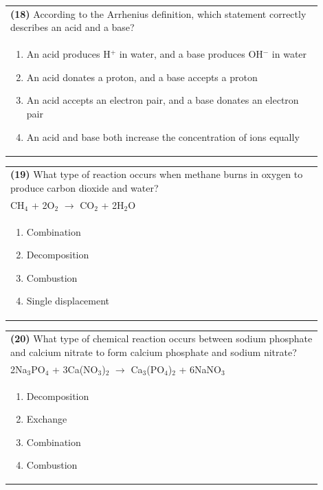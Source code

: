 \documentclass{article}
\begin{document}
\noindent\begin{tabular}{|p{0.9\linewidth}|}
\hline
\textbf{(18)} According to the Arrhenius definition, which statement correctly describes an acid and a base?\\[0.2cm]
\begin{minipage}[t]{0.85\linewidth}
\begin{enumerate}[label=\alph*.]
\item An acid produces H$^+$ in water, and a base produces OH$^-$ in water
\item An acid donates a proton, and a base accepts a proton
\item An acid accepts an electron pair, and a base donates an electron pair
\item An acid and base both increase the concentration of ions equally
\end{enumerate}
\end{minipage}\\[0.2cm]
\hline
\end{tabular}


\noindent\begin{tabular}{|p{0.9\linewidth}|}
\hline
\textbf{(19)} What type of reaction occurs when methane burns in oxygen to produce carbon dioxide and water?\\[0.2cm]
CH$_4$ + 2O$_2$ $\rightarrow$ CO$_2$ + 2H$_2$O\\[0.2cm]
\begin{minipage}[t]{0.85\linewidth}
\begin{enumerate}[label=\alph*.]
\item Combination
\item Decomposition
\item Combustion
\item Single displacement
\end{enumerate}
\end{minipage}\\[0.2cm]
\hline
\end{tabular}

\noindent\begin{tabular}{|p{0.9\linewidth}|}
\hline
\textbf{(20)} What type of chemical reaction occurs between sodium phosphate and calcium nitrate to form calcium phosphate and sodium nitrate?\\[0.2cm]
2Na$_3$PO$_4$ + 3Ca(NO$_3$)$_2$ $\rightarrow$ Ca$_3$(PO$_4$)$_2$ + 6NaNO$_3$\\[0.2cm]
\begin{minipage}[t]{0.85\linewidth}
\begin{enumerate}[label=\alph*.]
\item Decomposition
\item Exchange
\item Combination
\item Combustion
\end{enumerate}
\end{minipage}\\[0.2cm]
\hline
\end{tabular}
\newpage
\end{document}
